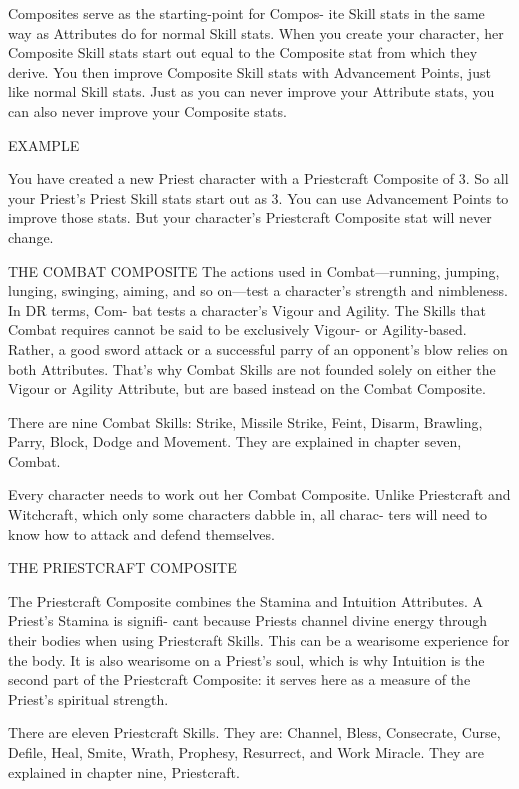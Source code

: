 \documentclass[11pt,twocolumn]{book}
\begin{document}
Composites serve as the starting-point for Compos- ite Skill stats in the same way as Attributes do for normal Skill stats. When you create your character, her Composite Skill stats start out equal to the Composite stat from which they derive. You then improve Composite Skill stats with Advancement Points, just like normal Skill stats. Just as you can never improve your Attribute stats, you can also never improve your Composite stats.

\begin{mdframed}
EXAMPLE

You have created a new Priest character with a Priestcraft Composite of 3. So all your Priest’s Priest Skill stats start out as 3. You can use Advancement Points to improve those stats. But your character’s Priestcraft Composite stat will never change.
\end{mdframed}

THE COMBAT COMPOSITE
The actions used in Combat—running, jumping, lunging, swinging, aiming, and so on—test a character’s strength and nimbleness. In DR terms, Com- bat tests a character’s Vigour and Agility. The Skills that Combat requires cannot be said to be exclusively Vigour- or Agility-based. Rather, a good sword attack or a successful parry of an opponent’s blow relies on both Attributes. That’s why Combat Skills are not founded solely on either the Vigour or Agility Attribute, but are based instead on the Combat Composite.

There are nine Combat Skills: Strike, Missile Strike, Feint, Disarm, Brawling, Parry, Block, Dodge and Movement. They are explained in chapter seven, Combat.

Every character needs to work out her Combat Composite. Unlike Priestcraft and Witchcraft, which only some characters dabble in, all charac- ters will need to know how to attack and defend themselves.

THE PRIESTCRAFT COMPOSITE

The Priestcraft Composite combines the Stamina and Intuition Attributes. A Priest’s Stamina is signifi- cant because Priests channel divine energy through their bodies when using Priestcraft Skills. This can be a wearisome experience for the body. It is also wearisome on a Priest’s soul, which is why Intuition is the second part of the Priestcraft Composite: it serves here as a measure of the Priest’s spiritual strength.

There are eleven Priestcraft Skills. They are: Channel, Bless, Consecrate, Curse, Defile, Heal, Smite, Wrath, Prophesy, Resurrect, and Work Miracle. They are explained in chapter nine, Priestcraft.
\end{document}
